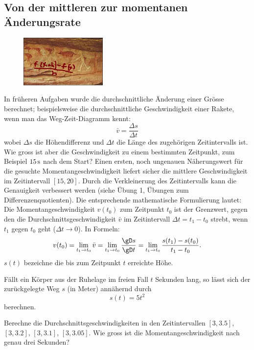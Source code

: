 \documentclass[%
11pt,%
twoside,%
titlepage,%
german,%
headsepline%
]{scrartcl}
\begin{document}
\subsection{Von der mittleren zur momentanen \"Anderungsrate}
\begin{figure}
  \begin{center}
    \includegraphics[width=0.382\textwidth]{pictures/cave}
  \end{center}
\end{figure}
In fr\"uheren Aufgaben wurde die durchschnittliche \"Anderung einer Gr\"osse berechnet; beispielsweise die durchschnittliche Geschwindigkeit einer Rakete, wenn man das Weg-Zeit-Diagramm kennt:
$$\bar{v}=\frac{\Delta s}{\Delta t}$$
wobei $\Delta s$ die H\"ohendifferenz und $\Delta t$ die L\"ange des zugeh\"origen Zeitintervalls ist.
Wie gross ist aber die Geschwindigkeit zu einem bestimmten Zeitpunkt, zum Beispiel $\unit[15]{s}$ nach dem Start? Einen ersten, noch ungenauen N\"aherungswert f\"ur die gesuchte Momentangeschwindigkeit liefert sicher die mittlere Geschwindigkeit im Zeitintervall $[15,20]$. Durch die Verkleinerung des Zeitintervalls kann die Genauigkeit verbessert werden (siehe \"Ubung 1, \"Ubungen zum Differenzenquotienten). Die entsprechende mathematische Formulierung lautet:
Die Momentangeschwindigkeit $v(t_0)$ zum Zeitpunkt $t_0$ ist der Grenzwert, gegen den die Durchschnittsgeschwindigkeit $\bar{v}$ im Zeitintervall $\Delta t=t_1-t_0$ strebt, wenn $t_1$ gegen $t_0$ geht ($\Delta t\rightarrow 0$). In Formeln:
$$v(t_0)=\lim_{t_1\rightarrow t_0}\bar{v}=\lim_{t_1\rightarrow t_0}\frac{\gD s}{\gD t}=\lim_{t_1\rightarrow t_0}\frac{s(t_1)-s(t_0)}{t_1-t_0}.$$
$s(t)$ bezeichne  die bis zum Zeitpunkt $t$ erreichte H\"ohe.

\begin{ueb}\label{uebfreierfall}
F\"allt ein K\"orper aus der Ruhelage im freien Fall $t$ Sekunden lang, so l\"asst sich der zur\"uckgelegte Weg $s$ (in Meter) ann\"ahernd durch
$$s(t)=5t^2$$
berechnen.

Berechne die Durchschnittsgeschwindigkeiten in den Zeitintervallen $[3,3.5]$, $[3,3.2]$, $[3,3.1]$, $[3,3.05]$. Wie gross ist die Momentangeschwindigkeit nach genau drei Sekunden?
\end{ueb}
\end{document}
